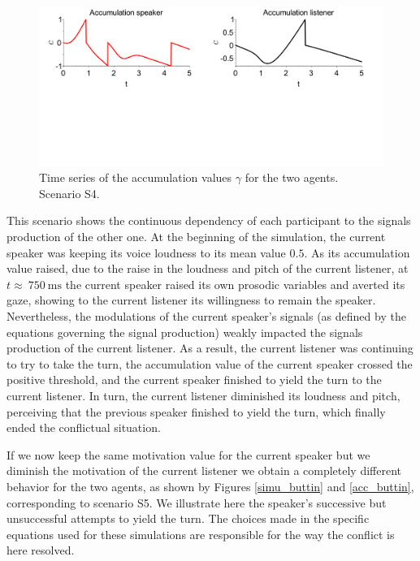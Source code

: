 \begin{figure}
  \centering
  \includegraphics[width=\linewidth]{figure/acc_sc4_small.pdf}
  \caption{Time series of the accumulation values $\gamma$ for the two agents. Scenario S4.}
  \label{inter_acc}
\end{figure}

This scenario shows the continuous dependency of each participant to the signals production of the other one. At the beginning of the simulation, the current speaker was keeping its voice loudness to its mean value $0.5$. As its accumulation value raised, due to the raise in the loudness and pitch of the current listener, at $t\approx~750~\text{ms}$ the current speaker raised its own prosodic variables and averted its gaze, showing to the current listener its willingness to remain the speaker. Nevertheless, the modulations of the current speaker's signals (as defined by the equations governing the signal production) weakly impacted the signals production of the current listener. As a result, the current listener was continuing to try to take the turn, the accumulation value of the current speaker crossed the positive threshold, and the current speaker finished to yield the turn to the current listener. In turn, the current listener diminished its loudness and pitch, perceiving that the previous speaker finished to yield the turn, which finally ended the conflictual situation.

If we now keep the same motivation value for the current speaker but we diminish the motivation of the current listener we obtain a completely different behavior for the two agents, as shown by Figures \ref{simu_buttin} and \ref{acc_buttin}, corresponding to scenario S5. We illustrate here the speaker's successive but unsuccessful attempts to yield the turn. The choices made in the specific equations used for these simulations are responsible for the way the conflict is here resolved.  

